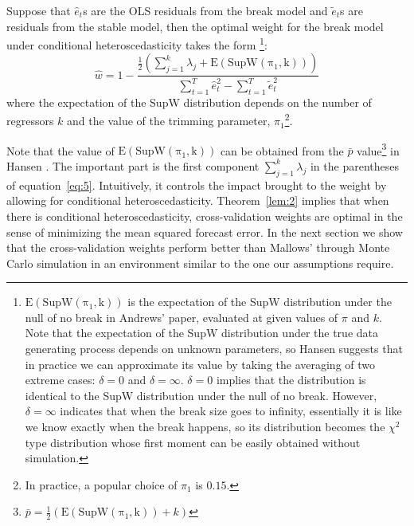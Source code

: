 \begin{theorem} \label{lem:2}
Suppose that $\hat{e}_t$s are the OLS residuals from the break model and $\tilde{e}_t$s are residuals from the stable model, then the optimal weight for the break model under conditional heteroscedasticity takes the form \footnote{$\mathrm{E(SupW(\pi_1,k))}$ is the expectation of the SupW distribution under the null of no break in Andrews' paper, evaluated at given values of $\pi$ and $k$. Note that the expectation of the SupW distribution under the true data generating process depends on unknown parameters, so Hansen suggests that in practice we can approximate its value by taking the averaging of two extreme cases: $\delta = 0$ and $\delta = \infty$. $\delta = 0$ implies that the distribution is identical to the SupW distribution under the null of no break. However, $\delta = \infty$ indicates that when the break size goes to infinity, essentially it is like we know exactly when the break happens, so its distribution becomes the $\chi^2$ type distribution whose first moment can be easily obtained without simulation.}:
\begin{equation} \label{eq:5}
	\hat{w} = 1 - \frac{\frac{1}{2}(\sum_{j=1}^{k}\lambda_j + \mathrm{E(SupW(\pi_1,k))})}{\sum_{t=1}^{T}\hat{e}_t^2 - \sum_{t=1}^{T}\tilde{e}_t^2}
\end{equation}
where the expectation of the SupW distribution depends on the number of regressors $k$ and the value of the trimming parameter, $\pi_1$\footnote{In practice, a popular choice of $\pi_1$ is $0.15$.}.
\end{theorem}
Note that the value of $\mathrm{E(SupW(\pi_1,k))}$ can be obtained from the $\bar{p}$ value\footnote{$\bar{p} = \frac{1}{2}(\mathrm{E(SupW(\pi_1,k))} + k)$} in Hansen \cite{hansen2009averaging}. The important part is the first component $\sum_{j=1}^{k}\lambda_j$ in the parentheses of equation~\ref{eq:5}. Intuitively, it controls the impact brought to the weight by allowing for conditional heteroscedasticity. Theorem~\ref{lem:2} implies that when there is conditional heteroscedasticity, cross-validation weights are optimal in the sense of minimizing the mean squared forecast error. In the next section we show that the cross-validation weights perform better than Mallows' through Monte Carlo simulation in an environment similar to the one our assumptions require.  